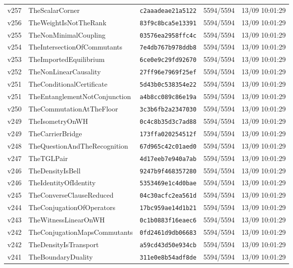 \documentclass[11pt]{article}
\theoremstyle{definition}\newtheorem{deriv}{Derivation}
\begin{document}
{\begin{longtable}{@{}lllll@{}}
v257 & TheScalarCorner & \texttt{c2aaadeae21a5122} & 5594/5594 & 13/09 10:01:29 \\
v256 & TheWeightIsNotTheRank & \texttt{83f9c8bca5e13391} & 5594/5594 & 13/09 10:01:29 \\
v255 & TheNonMinimalCoupling & \texttt{03576ea2958ffc4c} & 5594/5594 & 13/09 10:01:29 \\
v254 & TheIntersectionOfCommutants & \texttt{7e4db767b978ddb8} & 5594/5594 & 13/09 10:01:29 \\
v253 & TheImportedEquilibrium & \texttt{6ce0e9c29fd92670} & 5594/5594 & 13/09 10:01:29 \\
v252 & TheNonLinearCausality & \texttt{27ff96e7969f25ef} & 5594/5594 & 13/09 10:01:29 \\
v251 & TheConditionalCertificate & \texttt{5d43b0c538354e22} & 5594/5594 & 13/09 10:01:29 \\
v251 & TheEntanglementNotConjunction & \texttt{a4b8cc089c86e19a} & 5594/5594 & 13/09 10:01:29 \\
v250 & TheCommutationAtTheFloor & \texttt{3c3b6fb2a2347030} & 5594/5594 & 13/09 10:01:29 \\
v249 & TheIsometryOnWH & \texttt{0c4c8b35d3c7ad88} & 5594/5594 & 13/09 10:01:29 \\
v249 & TheCarrierBridge & \texttt{173ffa020254512f} & 5594/5594 & 13/09 10:01:29 \\
v248 & TheQuestionAndTheRecognition & \texttt{67d965c42c01aed0} & 5594/5594 & 13/09 10:01:29 \\
v247 & TheTGLPair & \texttt{4d17eeb7e940a7ab} & 5594/5594 & 13/09 10:01:29 \\
v246 & TheDensityIsBell & \texttt{9247b9f468357280} & 5594/5594 & 13/09 10:01:29 \\
v246 & TheIdentityOfIdentity & \texttt{5353469e1c4d0bae} & 5594/5594 & 13/09 10:01:29 \\
v245 & TheConverseClauseReduced & \texttt{04c30acfc2ea561d} & 5594/5594 & 13/09 10:01:29 \\
v244 & TheConjugationOfOperators & \texttt{17bc959ae14d1b21} & 5594/5594 & 13/09 10:01:29 \\
v243 & TheWitnessLinearOnWH & \texttt{0c1b0883f16eaec6} & 5594/5594 & 13/09 10:01:29 \\
v242 & TheConjugationMapsCommutants & \texttt{0fd2461d9db06683} & 5594/5594 & 13/09 10:01:29 \\
v242 & TheDensityIsTransport & \texttt{a59cd43d50e934cb} & 5594/5594 & 13/09 10:01:29 \\
v241 & TheBoundaryDuality & \texttt{311e0e8b54adf8de} & 5594/5594 & 13/09 10:01:29 \\

\end{longtable}}
\end{document}
